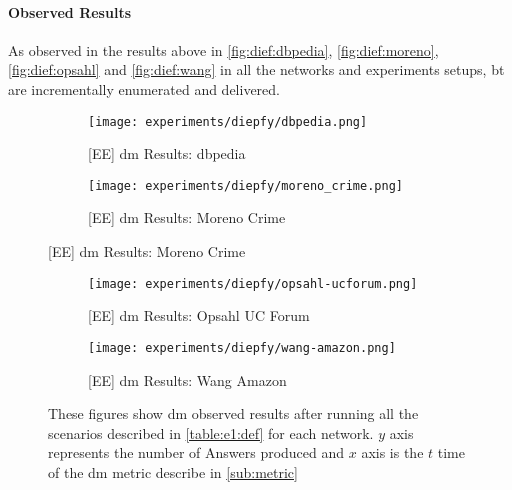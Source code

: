  \paragraph{Observed Results}\label{sub:sec:res:e1}
 As observed in the results above in \autoref{fig:dief:dbpedia}, \autoref{fig:dief:moreno}, \autoref{fig:dief:opsahl} and \autoref{fig:dief:wang} in all the networks and experiments setups, \acrshort{bt} are incrementally enumerated and delivered. 

 \begin{figure}[!htb]
  \centering
  \begin{subfigure}{0.5\textwidth}
   \texttt{[image: experiments/diepfy/dbpedia.png]}
    \caption{{[EE] \acrshort{dm} Results: \acrshort{dbpedia}}}
    \label{fig:dief:dbpedia}
  \end{subfigure}%
  \begin{subfigure}{0.5\textwidth}
   \texttt{[image: experiments/diepfy/moreno\_crime.png]}
    \caption{{[EE] \acrshort{dm} Results: Moreno Crime}}
    \label{fig:dief:moreno}
  \end{subfigure}
\end{figure}
%
\begin{figure}[!htb]
  \centering
  \begin{subfigure}{0.5\textwidth}
   \texttt{[image: experiments/diepfy/opsahl-ucforum.png]}
    \caption{{[EE] \acrshort{dm} Results: Opsahl UC Forum}}
    \label{fig:dief:opsahl}
  \end{subfigure}%
  \begin{subfigure}{0.5\textwidth}
    \texttt{[image: experiments/diepfy/wang-amazon.png]}
     \caption{{[EE] \acrshort{dm} Results: Wang Amazon}}
     \label{fig:dief:wang}
   \end{subfigure}
   \caption[{[EE] \acrshort{dm} General Results}]{These figures show \acrshort{dm} observed results after running all the scenarios described in \autoref{table:e1:def} for each network. $y$ axis represents the number of Answers produced and $x$ axis is the $t$ time of the \acrshort{dm} metric describe in \autoref{sub:metric}}
   \label{fig:dief:all}
 \end{figure}

